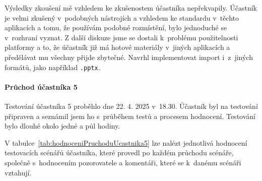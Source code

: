 Výsledky zkoušení mě vzhledem ke zkušenostem účastníka nepřekvapily.
Účastník je velmi zkušený v~podobných nástrojích a vzhledem ke standardu v~těchto aplikacích a tomu, že používám podobné rozmístění, bylo jednoduché se v~rozhraní vyznat.
Z další diskuze jsme se dostali k~problému použitelnosti platformy a to, že účastník již má hotové materiály v~jiných aplikacích a předělávat mu všechny přijde zbytečné.
Navrhl implementovat import i~z~jiných formátů, jako například \verb|.pptx|.

\paragraph{Průchod účastníka 5}

Testování účastníka 5 proběhlo dne 22. 4. 2025 v~18.30. 
Účastník byl na testování připraven a seznámil jsem ho s~průběhem testů a procesem hodnocení. 
Testování bylo dlouhé okolo jedné a půl hodiny.

V tabulce~\ref{tab:hodnoceniPruchoduUcastnika5} lze nalézt jednotlivá hodnocení testovacích scénářů účastníka, které provedl po každém průchodu scénáře, společně s~hodnocením pozorovatele a komentáři, které se k~danému scénáři vztahují.

